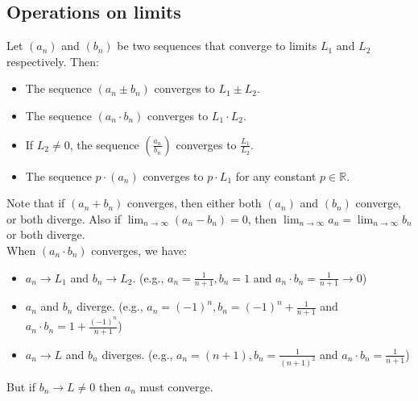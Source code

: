 \subsection{Operations on limits}
\begin{theorem}
    Let \( (a_n) \) and \( (b_n) \) be two sequences that converge to limits \( L_1 \) and \( L_2 \) respectively. Then:
    \begin{itemize}[itemsep=1pt,label=$\circ$]
        \item The sequence \( (a_n \pm b_n) \) converges to \( L_1 \pm L_2 \).
        \item The sequence \( (a_n \cdot b_n) \) converges to \( L_1 \cdot L_2 \).
        \item If \( L_2 \neq 0 \), the sequence \( \left(\frac{a_n}{b_n}\right) \) converges to \( \frac{L_1}{L_2} \).
        \item The sequence \( p \cdot (a_n) \) converges to \( p \cdot L_1 \) for any constant \( p \in \mathbb{R} \).
    \end{itemize}
\end{theorem}
Note that if $(a_n + b_n)$ converges, then either both $(a_n)$ and $(b_n)$ converge, or both diverge. Also if $\lim_{n \to \infty} (a_n - b_n) = 0$, then $\lim_{n \to \infty} a_n = \lim_{n \to \infty} b_n$ or both diverge. \\
When $(a_n \cdot b_n)$ converges, we have:
\begin{itemize}[itemsep=1pt,label=$\circ$]
    \item $a_n \to L_1$ and $b_n \to L_2$. (e.g., $a_n = \frac{1}{n + 1}, b_n = 1$ and $a_n \cdot b_n = \frac{1}{n + 1} \to 0$)
    \item $a_n$ and $b_n$ diverge. (e.g., $a_n = (-1)^n, b_n = (-1)^n + \frac{1}{n + 1}$ and $a_n \cdot b_n = 1 + \frac{(-1)^n}{n + 1}$)
    \item $a_n \to L$ and $b_n$ diverges. (e.g., $a_n = (n + 1), b_n = \frac{1}{(n + 1)^2}$ and $a_n \cdot b_n = \frac{1}{n + 1}$)
\end{itemize}
But if $b_n \to L \neq 0$ then $a_n$ must converge. \\
 
